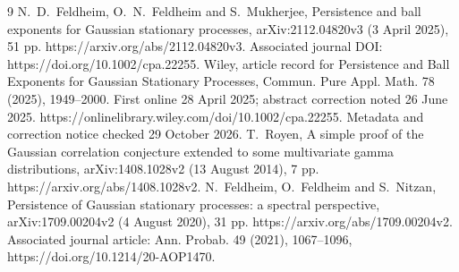 \documentclass[10pt]{article}
\begin{document}
9 N. D. Feldheim, O. N. Feldheim and S. Mukherjee, Persistence and ball exponents for Gaussian stationary processes, arXiv:2112.04820v3 (3 April 2025), 51 pp. https://arxiv.org/abs/2112.04820v3. Associated journal DOI: https://doi.org/10.1002/cpa.22255. Wiley, article record for Persistence and Ball Exponents for Gaussian Stationary Processes, Commun. Pure Appl. Math. 78 (2025), 1949–2000. First online 28 April 2025; abstract correction noted 26 June 2025. https://onlinelibrary.wiley.com/doi/10.1002/cpa.22255. Metadata and correction notice checked 29 October 2026. T. Royen, A simple proof of the Gaussian correlation conjecture extended to some multivariate gamma distributions, arXiv:1408.1028v2 (13 August 2014), 7 pp. https://arxiv.org/abs/1408.1028v2. N. Feldheim, O. Feldheim and S. Nitzan, Persistence of Gaussian stationary processes: a spectral perspective, arXiv:1709.00204v2 (4 August 2020), 31 pp. https://arxiv.org/abs/1709.00204v2. Associated journal article: Ann. Probab. 49 (2021), 1067–1096, https://doi.org/10.1214/20-AOP1470.\par
\end{document}
